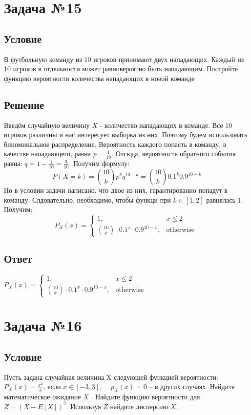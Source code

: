 \documentclass{article}
\begin{document}
\section*{Задача №15}
\subsection*{Условие}
В футбольную команду из 10 игроков принимают двух нападающих. Каждый
из 10 игроков в отдельности может равновероятно быть нападающим. Постройте
функцию вероятности количества нападающих в новой команде 
\subsection*{Решение}
Введём случайную величину $X$ - количество нападающих в команде. Все 10 игроков различны и нас интересует выборка из них. Поэтому будем использовать биноминальное распределение. Вероятность каждого попасть в команду, в качестве нападающего, равна $p = \frac{1}{10}$. Отсюда, вероятность обратного события равна: $q=1 - \frac{1}{10} = \frac{9}{10}$. Получим формулу:
\[
    P(X=k) = \binom{10}{k}p^kq^{10-k} = \binom{10}{k}0.1^k0.9^{10-k}
\]
Но в условии задачи написано, что двое из них, гарантированно попадут в команду. Слдовательно, необходимо, чтобы функци при $k \in [1,2]$ равнялась 1.
Получим:
\[
    P_X(x) = \begin{cases}
        1, & x \leq 2 \\ 
        \binom{10}{x} \cdot 0.1^{x} \cdot 0.9^{10-x}, & \text{otherwise } \end{cases}
\]
\subsection*{Ответ}
$P_X(x) = \begin{cases}
    1, & x \leq 2 \\ 
    \binom{10}{x} \cdot 0.1^{x} \cdot 0.9^{10-x}, & \text{otherwise } \end{cases}
    $

\section*{Задача №16}
\subsection*{Условие}
Пусть задана случайная величина X следующей функцией вероятности: \(P_X(x) = \frac{x^2}{a}\), если \(x \in [-3, 3]\), \(\quad p_X(x) = 0\) – в других случаях. Найдите математическое
ожидание $X$ . Найдите функцию вероятности для \(Z = (X - E[X])^2\). Используя \(Z\) найдите дисперсию \(X\).
\end{document}
